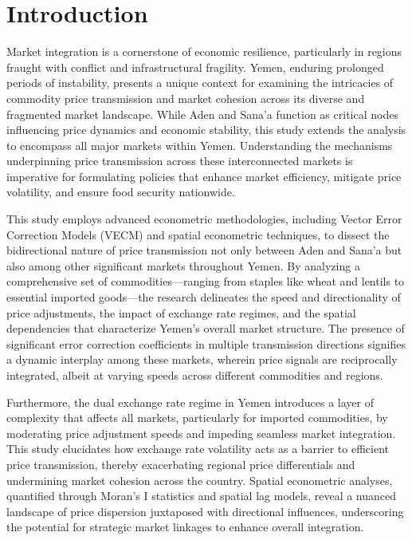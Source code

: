 \section{Introduction}
\small  %
\setlength{\parskip}{0.3em}  %

Market integration is a cornerstone of economic resilience, particularly in regions fraught with conflict and infrastructural fragility. Yemen, enduring prolonged periods of instability, presents a unique context for examining the intricacies of commodity price transmission and market cohesion across its diverse and fragmented market landscape. While Aden and Sana’a function as critical nodes influencing price dynamics and economic stability, this study extends the analysis to encompass all major markets within Yemen. Understanding the mechanisms underpinning price transmission across these interconnected markets is imperative for formulating policies that enhance market efficiency, mitigate price volatility, and ensure food security nationwide.

This study employs advanced econometric methodologies, including Vector Error Correction Models (VECM) and spatial econometric techniques, to dissect the bidirectional nature of price transmission not only between Aden and Sana’a but also among other significant markets throughout Yemen. By analyzing a comprehensive set of commodities—ranging from staples like wheat and lentils to essential imported goods—the research delineates the speed and directionality of price adjustments, the impact of exchange rate regimes, and the spatial dependencies that characterize Yemen’s overall market structure. The presence of significant error correction coefficients in multiple transmission directions signifies a dynamic interplay among these markets, wherein price signals are reciprocally integrated, albeit at varying speeds across different commodities and regions.

Furthermore, the dual exchange rate regime in Yemen introduces a layer of complexity that affects all markets, particularly for imported commodities, by moderating price adjustment speeds and impeding seamless market integration. This study elucidates how exchange rate volatility acts as a barrier to efficient price transmission, thereby exacerbating regional price differentials and undermining market cohesion across the country. Spatial econometric analyses, quantified through Moran’s I statistics and spatial lag models, reveal a nuanced landscape of price dispersion juxtaposed with directional influences, underscoring the potential for strategic market linkages to enhance overall integration.


